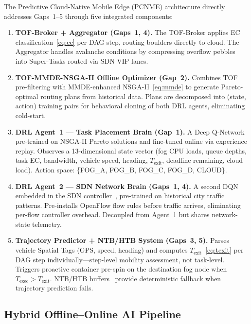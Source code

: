 \documentclass[12pt,a4paper]{article}
\begin{document}
The Predictive Cloud-Native Mobile Edge (PCNME) architecture directly addresses
Gaps~1--5 through five integrated components:

\begin{enumerate}[leftmargin=*]
  \item \textbf{TOF-Broker + Aggregator (Gaps~1, 4).}
    The TOF-Broker applies EC classification~\eqref{eq:ec} per DAG step, routing
    boulders directly to cloud. The Aggregator handles avalanche conditions by
    compressing overflow pebbles into Super-Tasks routed via SDN VIP lanes.

  \item \textbf{TOF-MMDE-NSGA-II Offline Optimizer (Gap~2).}
    Combines TOF pre-filtering with MMDE-enhanced NSGA-II~\eqref{eq:mmde} to
    generate Pareto-optimal routing plans from historical data. Plans are
    decomposed into (state, action) training pairs for behavioral cloning of
    both DRL agents, eliminating cold-start.

  \item \textbf{DRL Agent~1 --- Task Placement Brain (Gap~1).}
    A Deep Q-Network~\cite{vfc_drl2024} pre-trained on NSGA-II Pareto solutions
    and fine-tuned online via experience replay. Observes a 13-dimensional state
    vector (fog CPU loads, queue depths, task EC, bandwidth, vehicle speed,
    heading, $T_{\text{exit}}$, deadline remaining, cloud load). Action space:
    \{FOG\_A, FOG\_B, FOG\_C, FOG\_D, CLOUD\}.

  \item \textbf{DRL Agent~2 --- SDN Network Brain (Gaps~1, 4).}
    A second DQN embedded in the SDN controller~\cite{csfd2025}, pre-trained on
    historical city traffic patterns. Pre-installs OpenFlow flow rules before
    traffic arrives, eliminating per-flow controller overhead. Decoupled from
    Agent~1 but shares network-state telemetry.

  \item \textbf{Trajectory Predictor + NTB/HTB System (Gaps~3, 5).}
    Parses vehicle Spatial Tags (GPS, speed, heading) and computes
    $T_{\text{exit}}$~\eqref{eq:texit} per DAG step individually---step-level
    mobility assessment, not task-level. Triggers proactive container pre-spin
    on the destination fog node when $T_{\text{exec}} > T_{\text{exit}}$.
    NTB/HTB buffers~\cite{paper5_mobility} provide deterministic fallback when
    trajectory prediction fails.
\end{enumerate}

\subsection{Hybrid Offline--Online AI Pipeline}
\end{document}
